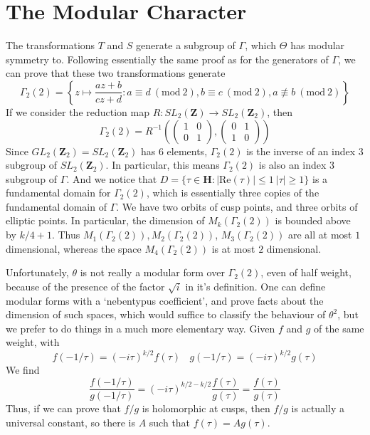 \documentclass{article}
\theoremstyle{plain}
\theoremstyle{remark}
\theoremstyle{definition}
\begin{document}
\section{The Modular Character}

The transformations $T$ and $S$ generate a subgroup of $\Gamma$, which $\Theta$ has modular symmetry to. Following essentially the same proof as for the generators of $\Gamma$, we can prove that these two transformations generate
%
\[ \Gamma_2(2) = \left\{ z \mapsto \frac{az + b}{cz + d}: a \equiv d\ (\text{mod}\ 2), b \equiv c\ (\text{mod}\ 2), a \not \equiv b\ (\text{mod}\ 2) \right\} \]
%
If we consider the reduction map $R: SL_2(\mathbf{Z}) \to SL_2(\mathbf{Z}_2)$, then
%
\[ \Gamma_2(2) = R^{-1} \left( \begin{pmatrix} 1 & 0 \\ 0 & 1 \end{pmatrix}, \begin{pmatrix} 0 & 1 \\ 1 & 0 \end{pmatrix} \right) \]
%
Since $GL_2(\mathbf{Z}_2) = SL_2(\mathbf{Z}_2)$ has $6$ elements, $\Gamma_2(2)$ is the inverse of an index 3 subgroup of $SL_2(\mathbf{Z}_2)$. In particular, this means $\Gamma_2(2)$ is also an index 3 subgroup of $\Gamma$. And we notice that $D = \{ \tau \in \mathbf{H}: |\text{Re}(\tau)| \leq 1\ |\tau| \geq 1 \}$ is a fundamental domain for $\Gamma_2(2)$, which is essentially three copies of the fundamental domain of $\Gamma$. We have two orbits of cusp points, and three orbits of elliptic points. In particular, the dimension of $M_k(\Gamma_2(2))$ is bounded above by $k/4 + 1$. Thus $M_1(\Gamma_2(2)), M_2(\Gamma_2(2))$, $M_3(\Gamma_2(2))$ are all at most $1$ dimensional, whereas the space $M_4(\Gamma_2(2))$ is at most $2$ dimensional.

Unfortunately, $\theta$ is not really a modular form over $\Gamma_2(2)$, even of half weight, because of the presence of the factor $\sqrt{i}$ in it's definition. One can define modular forms with a `nebentypus coefficient', and prove facts about the dimension of such spaces, which would suffice to classify the behaviour of $\theta^2$, but we prefer to do things in a much more elementary way. Given $f$ and $g$ of the same weight, with
%
\[ f(-1/\tau) = (-i\tau)^{k/2} f(\tau)\ \ \ \ g(-1/\tau) = (-i\tau)^{k/2} g(\tau) \]
%
We find
%
\[ \frac{f(-1/\tau)}{g(-1/\tau)} = (-i\tau)^{k/2 - k/2} \frac{f(\tau)}{g(\tau)} = \frac{f(\tau)}{g(\tau)} \]
%
Thus, if we can prove that $f/g$ is holomorphic at cusps, then $f/g$ is actually a universal constant, so there is $A$ such that $f(\tau) = Ag(\tau)$.
\end{document}
